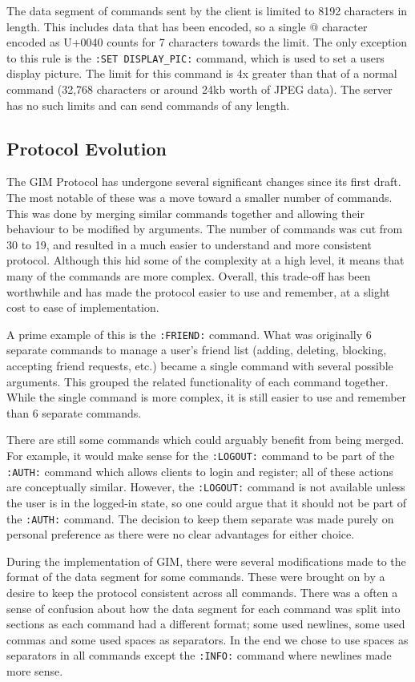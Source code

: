 The data segment of commands sent by the client is limited to 8192 characters in length. This includes data that has been encoded, so a single @ character encoded as \SLASH U+0040 counts for 7 characters towards the limit. The only exception to this rule is the \texttt{:SET DISPLAY\_PIC:} command, which is used to set a users display picture. The limit for this command is 4x greater than that of a normal command (32,768 characters or around 24kb worth of JPEG data). The server has no such limits and can send commands of any length.


\subsection{Protocol Evolution}

The GIM Protocol has undergone several significant changes since its first draft. The most notable of these was a move toward a smaller number of commands. This was done by merging similar commands together and allowing their behaviour to be modified by arguments. The number of commands was cut from 30 to 19, and resulted in a much easier to understand and more consistent protocol. Although this hid some of the complexity at a high level, it means that many of the commands are more complex. Overall, this trade-off has been worthwhile and has made the protocol easier to use and remember, at a slight cost to ease of implementation.

A prime example of this is the \texttt{:FRIEND:} command. What was originally 6 separate commands to manage a user's friend list (adding, deleting, blocking, accepting friend requests, etc.) became a single command with several possible arguments. This grouped the related functionality of each command together. While the single command is more complex, it is still easier to use and remember than 6 separate commands.

There are still some commands which could arguably benefit from being merged. For example, it would make sense for the \texttt{:LOGOUT:} command to be part of the \texttt{:AUTH:} command which allows clients to login and register; all of these actions are conceptually similar. However, the \texttt{:LOGOUT:} command is not available unless the user is in the logged-in state, so one could argue that it should not be part of the \texttt{:AUTH:} command. The decision to keep them separate was made purely on personal preference as there were no clear advantages for either choice. 

During the implementation of GIM, there were several modifications made to the format of the data segment for some commands. These were brought on by a desire to keep the protocol consistent across all commands. There was a often a sense of confusion about how the data segment for each command was split into sections as each command had a different format; some used newlines, some used commas and some used spaces as separators. In the end we chose to use spaces as separators in all commands except the \texttt{:INFO:} command where newlines made more sense. 

